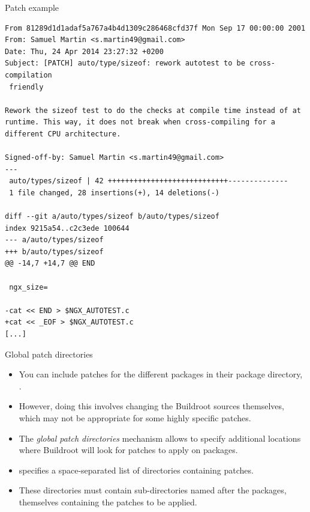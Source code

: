 \begin{frame}[fragile]{Patch example}

\begin{block}{}
{\tiny
\begin{verbatim}
From 81289d1d1adaf5a767a4b4d1309c286468cfd37f Mon Sep 17 00:00:00 2001
From: Samuel Martin <s.martin49@gmail.com>
Date: Thu, 24 Apr 2014 23:27:32 +0200
Subject: [PATCH] auto/type/sizeof: rework autotest to be cross-compilation
 friendly

Rework the sizeof test to do the checks at compile time instead of at
runtime. This way, it does not break when cross-compiling for a
different CPU architecture.

Signed-off-by: Samuel Martin <s.martin49@gmail.com>
---
 auto/types/sizeof | 42 ++++++++++++++++++++++++++++--------------
 1 file changed, 28 insertions(+), 14 deletions(-)

diff --git a/auto/types/sizeof b/auto/types/sizeof
index 9215a54..c2c3ede 100644
--- a/auto/types/sizeof
+++ b/auto/types/sizeof
@@ -14,7 +14,7 @@ END
 
 ngx_size=
 
-cat << END > $NGX_AUTOTEST.c
+cat << _EOF > $NGX_AUTOTEST.c
[...]
\end{verbatim}}
\end{block}

\end{frame}

\begin{frame}{Global patch directories}
  \begin{itemize}
  \item You can include patches for the different packages in their
    package directory, .
  \item However, doing this involves changing the Buildroot sources
    themselves, which may not be appropriate for some highly specific
    patches.
  \item The {\em global patch directories} mechanism allows to specify
    additional locations where Buildroot will look for patches to
    apply on packages.
  \item {} specifies a space-separated list
    of directories containing patches.
  \item These directories must contain sub-directories named after the
    packages, themselves containing the patches to be applied.
  \end{itemize}
\end{frame}

